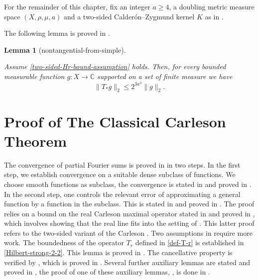 \documentclass[10pt,a4paper]{article}
\theoremstyle{plain}
\newtheorem{lemma}[theorem]{Lemma}
\theoremstyle{definition}
\numberwithin{equation}{subsection}
\newcommand{\lean}[1]{}
\newcommand{\uses}[1]{}
\newcommand{\leanok}{}
\def\C{\mathbb{C}}
\begin{document}
For the remainder of this chapter, fix an integer $a\ge 4$, a doubling metric measure space $(X,\rho,\mu,a)$ and a two-sided Calder\'on--Zygmund kernel $K$ as in .

The following lemma is proved in .
\begin{lemma}[nontangential-from-simple]\label{nontangential-from-simple}
    \leanok
    \lean{nontangential_from_simple}
    \uses{simple-nontangential-operator, nontangential-operator-boundary}
    Assume \eqref{two-sided-Hr-bound-assumption} holds.
    Then, for every bounded measurable function $g : X \to \C$ supported on a set of finite measure we have
    \begin{equation}\label{concretetstarbound}
        \|T_*g\|_2\le 2^{3a^3}\|g\|_2.
    \end{equation}
\end{lemma}

\section{Proof of The Classical Carleson Theorem}

The convergence of partial Fourier sums is proved in
 in two steps. In the first step,
we establish convergence on a suitable dense subclass of functions. We choose smooth functions as subclass, the convergence is stated in  and proved in .
In the second step, one controls the relevant error of approximating a general function by a function in
the subclass. This is stated in  and proved
in .
The proof relies on a bound on the real Carleson maximal operator stated in  and proved in , which involves showing that the real line fits into the setting of .
This latter proof refers to the two-sided variant of the Carleson . Two assumptions in  require more work. The boundedness of the operator $T_r$ defined in \eqref{def-T-r} is established in \ref{Hilbert-strong-2-2}. This lemma is proved in .
The cancellative property is verified by , which is proved in .
Several further auxiliary lemmas are stated and proved in , the proof of one of these auxiliary lemmas, , is done in .
\end{document}
